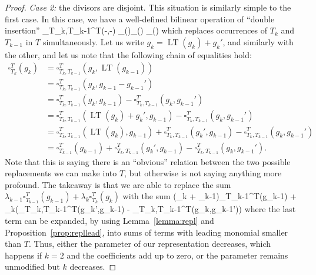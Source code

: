 \documentclass[fleqn, a4paper, twoside]{article}
\makeatletter
\newcommand{\lead}[1]{\operatorname{LT}(#1)}
\newcommand{\repl}[3]{\square_{#1}^{#2}(#3)}
\newcommand{\0}{\langle 0\rangle}
\newcommand{\XX}{\mathcal{X}}
\newcommand{\FF}{\mathcal{F}}
\newcommand{\ari}{\operatorname{ar}}
\let\[\@undefined
\DeclareRobustCommand{\[}{\begin{equation}}%
\let\]\@undefined
\DeclareRobustCommand{\]}{\end{equation}}%
\theoremstyle{mytheorem}
\theoremstyle{introthm}
\theoremstyle{mydefinition}
\theoremstyle{mydefinition2}
\theoremstyle{plain} %
\newcommand{\?}{\,?\,}
\theoremstyle{mytheorem}
\theoremstyle{plain} %
\makeatother
\begin{document}
\begin{proof}
\emph{Case 2:} the divisors are disjoint.  This situation
is similarly simple to the first case. In this case, we have
a well-defined bilinear operation of ``double insertion''
\[
\repl{T_k,T_{k-1}}{T}{-,-} \FF_\XX(\ari{T_{k-1}})\otimes \FF_\XX(\ari{T_{k}}) 
\longrightarrow \FF_\XX(\ari{T})
\]
which replaces occurrences of $T_k$ and $T_{k-1}$ in 
$T$ simultaneously.
Let us write $g_k  = \lead{g_k} + g_k'$, and similarly
with the other, and let us note that the following chain of
equalities hold:
\begin{align*}
\repl{T_k}{T}{g_k} 
	&= \repl{T_k,T_{k-1}}{T}{g_k,\lead{g_{k-1}}}   \\
	&= \repl{T_k,T_{k-1}}{T}{g_k,g_{k-1}-g_{k-1}'}	\\
		&=\repl{T_k,T_{k-1}}{T}{g_k,g_{k-1}}	- \repl{T_k,T_{k-1}}{T}{g_k,g_{k-1}'}	\\
		&=\repl{T_k,T_{k-1}}{T}{\lead{g_k}+g_k',g_{k-1}}	- \repl{T_k,T_{k-1}}{T}{g_k,g_{k-1}'}	\\
			&=\repl{T_k,T_{k-1}}{T}{\lead{g_k},g_{k-1}}
			+\repl{T_k,T_{k-1}}{T}{g_k',g_{k-1}}
				- \repl{T_k,T_{k-1}}{T}{g_k,g_{k-1}'}	\\
		&=\repl{T_{k-1}}{T}{g_{k-1}}
			+\repl{T_k,T_{k-1}}{T}{g_k',g_{k-1}}
				- \repl{T_k,T_{k-1}}{T}{g_k,g_{k-1}'}.
\end{align*}
Note that this is saying there is an ``obvious'' relation
between the two possible replacements we can make into $T$,
but otherwise is not saying anything more profound. The takeaway
is that we are able to replace the sum 
$\lambda_{k-1}\repl{T_{k-1}}{T}{g_{k-1}} + 
\lambda_k\repl{T_{k}}{T}{g_{k}} $ with the sum
\[ 
(\lambda_k + \lambda_{k-1})\repl{T_{k-1}}{T}{g_{k-1}} + 	
\lambda_{k}(\repl{T_k,T_{k-1}}{T}{g_k',g_{k-1}}
				- \repl{T_k,T_{k-1}}{T}{g_k,g_{k-1}'})
\]
where the last term can be expanded, by using Lemma~\ref{lemma:repl}
and Proposition~\ref{prop:repllead}, into sums of terms
with leading monomial smaller than $T$. Thus, either
the parameter of our representation decreases, which
happens if $k=2$ and the coefficients add up to zero,
or the parameter remains unmodified but $k$ decreases.


\end{proof}
\end{document}
